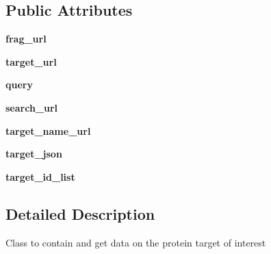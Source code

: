\subsection*{Public Attributes}
\begin{DoxyCompactItemize}
\item 
\mbox{\label{classfragalysis__api_1_1xcextracter_1_1getdata_1_1_get_targets_data_afa8f34da2572edae8988c21829ce9c3e}} 
{\bfseries frag\+\_\+url}
\item 
\mbox{\label{classfragalysis__api_1_1xcextracter_1_1getdata_1_1_get_targets_data_a7c14c7714ad794c49aa6354d47afdeba}} 
{\bfseries target\+\_\+url}
\item 
\mbox{\label{classfragalysis__api_1_1xcextracter_1_1getdata_1_1_get_targets_data_a3dffd252e6a0bbed273a8e6dbb6de886}} 
{\bfseries query}
\item 
\mbox{\label{classfragalysis__api_1_1xcextracter_1_1getdata_1_1_get_targets_data_a16daab7bc18679ec7c933297616a29ca}} 
{\bfseries search\+\_\+url}
\item 
\mbox{\label{classfragalysis__api_1_1xcextracter_1_1getdata_1_1_get_targets_data_a062afec53b3ec29811563ff02653de1b}} 
{\bfseries target\+\_\+name\+\_\+url}
\item 
\mbox{\label{classfragalysis__api_1_1xcextracter_1_1getdata_1_1_get_targets_data_a1978182ff74a964745ff788a25760b21}} 
{\bfseries target\+\_\+json}
\item 
\mbox{\label{classfragalysis__api_1_1xcextracter_1_1getdata_1_1_get_targets_data_aa58b4659be6811ef194daf3f3cab74a2}} 
{\bfseries target\+\_\+id\+\_\+list}
\end{DoxyCompactItemize}


\subsection{Detailed Description}
\begin{DoxyVerb}Class to contain and get data on the protein target of interest
\end{DoxyVerb}
 

